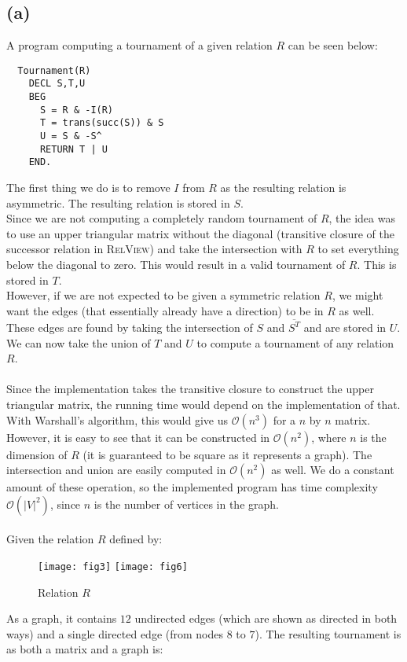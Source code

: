 \documentclass[a4paper, fleqn]{article}
\begin{document}
\subsection{(a)}
A program computing a tournament of a given relation $R$ can be seen below:
\begin{verbatim}
  Tournament(R)
    DECL S,T,U
    BEG
      S = R & -I(R)
      T = trans(succ(S)) & S
      U = S & -S^
      RETURN T | U
    END.
\end{verbatim}
The first thing we do is to remove $I$ from $R$ as the resulting relation is asymmetric.
The resulting relation is stored in $S$. \\
Since we are not computing a completely random tournament of $R$, the idea was to use an
upper triangular matrix without the diagonal (transitive closure of the successor
relation in \textsc{RelView}) and take the intersection with $R$ to set everything below
the diagonal to zero. This would result in a valid tournament of $R$. This is stored in
$T$. \\
However, if we are not expected to be given a symmetric relation $R$, we might want the
edges (that essentially already have a direction) to be in $R$ as well. These edges are
found by taking the intersection of $S$ and $\overline{S^T}$ and are stored in $U$. We
can now take the union of $T$ and $U$ to compute a tournament of any relation $R$. \\
\\
Since the implementation takes the transitive closure to construct the upper triangular
matrix, the running time would depend on the implementation of that. With Warshall's
algorithm, this would give us $\mathcal{O}(n^3)$ for a $n$ by $n$ matrix. However, it is
easy to see that it can be constructed in $\mathcal{O}(n^2)$, where $n$ is the dimension
of $R$ (it is guaranteed to be square as it represents a graph). The intersection and
union are easily computed in $\mathcal{O}(n^2)$ as well. We do a constant amount of these
operation, so the implemented program has time complexity $\mathcal{O}(|V|^2)$, since $n$
is the number of vertices in the graph.\\
\\
Given the relation $R$ defined by:
\begin{figure}[H]
  \centering
  \texttt{[image: fig3]}
  \texttt{[image: fig6]}
  \caption{Relation $R$}
\end{figure}
As a graph, it contains $12$ undirected edges (which are shown as directed in both ways) and
a single directed edge (from nodes $8$ to $7$). The resulting tournament is as both a matrix and a graph is:
\end{document}
